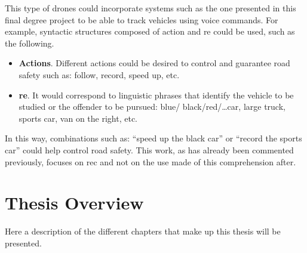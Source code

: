 This type of drones could incorporate systems such as the one presented in this
final degree project to be able to track vehicles using voice commands. For
example, syntactic structures composed of action and \gls{re} could be used,
such as the following.

\begin{itemize}
  \item \textbf{Actions}. Different actions could be desired to control and
  guarantee road safety such as: follow, record, speed up, etc.
  \item \textbf{\gls*{re}}. It would correspond to linguistic phrases that
  identify the vehicle to be studied or the offender to be pursued: blue/
  black/red/\ldots car, large truck, sports car, van on the right, etc.
\end{itemize}

In this way, combinations such as: ``speed up the black car'' or ``record the
sports car'' could help control road safety. This work, as has already been
commented previously, focuses on \gls{rec} and not on the use made of this
comprehension after.


\section{Thesis Overview}

Here a description of the different chapters that make up this thesis will be
presented.

